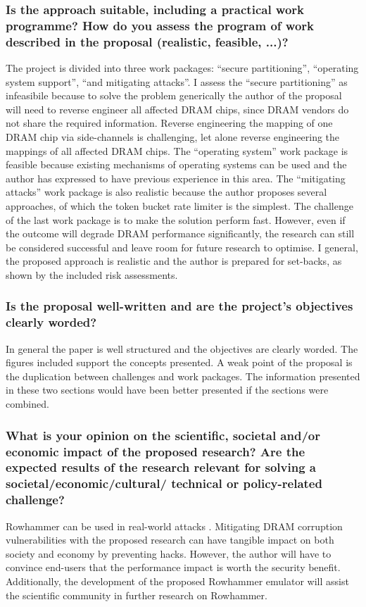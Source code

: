\subsubsection*{Is the approach suitable, including a practical work programme? How do you assess the program of work described in the proposal (realistic, feasible, ...)?}
The project is divided into three work packages: ``secure partitioning'', ``operating system support'', ``and mitigating attacks''. I assess the ``secure partitioning'' as infeasibile because to solve the problem generically the author of the proposal will need to reverse engineer all affected DRAM chips, since DRAM vendors do not share the required information. Reverse engineering the mapping of one DRAM chip via side-channels is challenging, let alone reverse engineering the mappings of all affected DRAM chips. The ``operating system'' work package is feasible because existing mechanisms of operating systems can be used and the author has expressed to have previous experience in this area. The ``mitigating attacks'' work package is also realistic because the author proposes several approaches, of which the token bucket rate limiter is the simplest. The challenge of the last work package is to make the solution perform fast. However, even if the outcome will degrade DRAM performance significantly, the research can still be considered successful and leave room for future research to optimise. I general, the proposed approach is realistic and the author is prepared for set-backs, as shown by the included risk assessments.

\subsubsection*{Is the proposal well-written and are the project’s objectives clearly worded?}
In general the paper is well structured and the objectives are clearly worded. The figures included support the concepts presented. A weak point of the proposal is the duplication between challenges and work packages. The information presented in these two sections would have been better presented if the sections were combined. %

\subsubsection*{What is your opinion on the scientific, societal and/or economic impact of the proposed research? Are the expected results of the research relevant for solving a societal/economic/cultural/ technical or policy-related challenge?}
Rowhammer can be used in real-world attacks \cite{van2016drammer}. Mitigating DRAM corruption vulnerabilities with the proposed research can have tangible impact on both society and economy by preventing hacks. However, the author will have to convince end-users that the performance impact is worth the security benefit. Additionally, the development of the proposed Rowhammer emulator will assist the scientific community in further research on Rowhammer.

